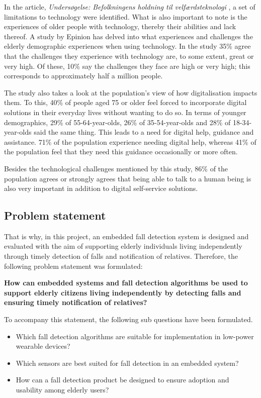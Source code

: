 In the article, \textit{Undersøgelse: Befolkningens holdning til velfærdsteknologi} \cite{noauthor_undersogelse_nodate}, a set of limitations to technology were identified. What is also important to note is the experiences of older people with technology, thereby their abilities and lack thereof. A study by Epinion has delved into what experiences and challenges the elderly demographic experiences when using technology. In the study 35\% agree that the challenges they experience with technology are, to some extent, great or very high. Of these, 10\% say the challenges they face are high or very high; this corresponds to approximately half a million people. 

The study also takes a look at the population's view of how digitalisation impacts them. To this, 40\% of people aged 75 or older feel forced to incorporate digital solutions in their everyday lives without wanting to do so. In terms of younger demographics, 29\% of 55-64-year-olds, 26\% of 35-54-year-olds and 28\% of 18-34-year-olds said the same thing. This leads to a need for digital help, guidance and assistance. 71\% of the population experience needing digital help, whereas 41\% of the population feel that they need this guidance occasionally or more often.

Besides the technological challenges mentioned by this study, 86\% of the population agrees or strongly agrees that being able to talk to a human being is also very important in addition to digital self-service solutions. 


\subsection{Problem statement}
That is why, in this project, an embedded fall detection system is designed and evaluated with the aim of supporting elderly individuals living independently through timely detection of falls and notification of relatives. Therefore, the following problem statement was formulated:


\textbf{How can embedded systems and fall detection algorithms be used to support elderly citizens living independently by detecting falls and ensuring timely notification of relatives?}

To accompany this statement, the following sub questions have been formulated.
\begin{itemize}
    \item Which fall detection algorithms are suitable for implementation in low-power wearable devices?
    \item Which sensors are best suited for fall detection in an embedded system?
    \item How can a fall detection product be designed to ensure adoption and usability among elderly users?
\end{itemize}

